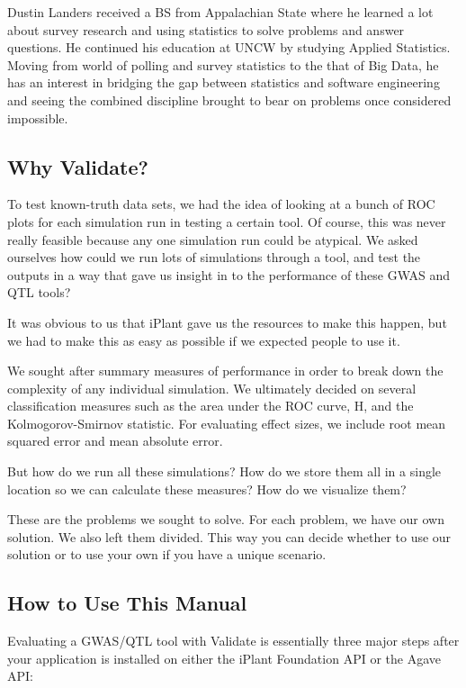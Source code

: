 \documentclass[twoside,a4paper]{refart}
\begin{document}
Dustin Landers received a BS from Appalachian State where he learned a lot about survey research and using statistics to solve problems and answer questions. He continued his education at UNCW by studying Applied Statistics. Moving from world of polling and survey statistics to the that of Big Data, he has an interest in bridging the gap between statistics and software engineering and seeing the combined discipline brought to bear on problems once considered impossible.


\subsection{Why Validate?}

To test known-truth data sets, we had the idea of looking at a bunch of ROC plots for each simulation run in testing a certain tool. Of course, this was never really feasible because any one simulation run could be atypical. We asked ourselves how could we run lots of simulations through a tool, and test the outputs in a way that gave us insight in to the performance of these GWAS and QTL tools?

It was obvious to us that iPlant gave us the resources to make this happen, but we had to make this as easy as possible if we expected people to use it. 

We sought after summary measures of performance in order to break down the complexity of any individual simulation. We ultimately decided on several classification measures such as the area under the ROC curve, H, and the Kolmogorov-Smirnov statistic. For evaluating effect sizes, we include root mean squared error and mean absolute error. 

But how do we run all these simulations? How do we store them all in a single location so we can calculate these measures? How do we visualize them?

These are the problems we sought to solve. For each problem, we have our own solution. We also left them divided. This way you can decide whether to use our solution or to use your own if you have a unique scenario.

\subsection{How to Use This Manual}

Evaluating a GWAS/QTL tool with Validate is essentially three major steps after your application is installed on either the iPlant Foundation API or the Agave API:
\end{document}
